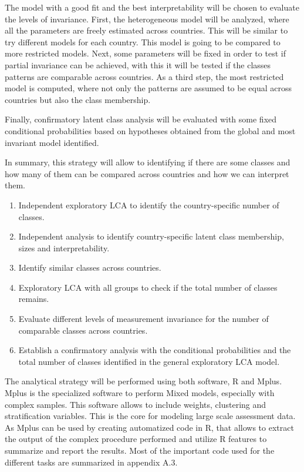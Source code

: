 \documentclass[12pt,a4paper,oneside]{reedthesis}
\providecommand{\tightlist}{%
  \setlength{\itemsep}{0pt}\setlength{\parskip}{0pt}}
\begin{document}
The model with a good fit and the best interpretability will be chosen to evaluate the levels of invariance. First, the heterogeneous model will be analyzed, where all the parameters are freely estimated across countries. This will be similar to try different models for each country. This model is going to be compared to more restricted models. Next, some parameters will be fixed in order to test if partial invariance can be achieved, with this it will be tested if the classes patterns are comparable across countries. As a third step, the most restricted model is computed, where not only the patterns are assumed to be equal across countries but also the class membership.

Finally, confirmatory latent class analysis will be evaluated with some fixed conditional probabilities based on hypotheses obtained from the global and most invariant model identified.

In summary, this strategy will allow to identifying if there are some classes and how many of them can be compared across countries and how we can interpret them.
\begin{enumerate}
\def\labelenumi{\arabic{enumi}.}
\tightlist
\item
  Independent exploratory LCA to identify the country-specific number of classes.
\item
  Independent analysis to identify country-specific latent class membership, sizes and interpretability.
\item
  Identify similar classes across countries.
\item
  Exploratory LCA with all groups to check if the total number of classes remains.
\item
  Evaluate different levels of measurement invariance for the number of comparable classes across countries.
\item
  Establish a confirmatory analysis with the conditional probabilities and the total number of classes identified in the general exploratory LCA model.
\end{enumerate}
The analytical strategy will be performed using both software, R and Mplus. Mplus is the specialized software to perform Mixed models, especially with complex samples. This software allows to include weights, clustering and stratification variables. This is the core for modeling large scale assessment data. As Mplus can be used by creating automatized code in R, that allows to extract the output of the complex procedure performed and utilize R features to summarize and report the results. Most of the important code used for the different tasks are summarized in appendix A.3.
\end{document}
